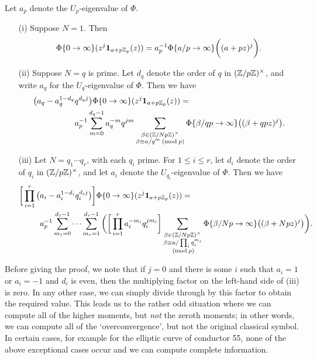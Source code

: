 \documentclass[a4paper,10pt]{article}
\numberwithin{equation}{section}
\begin{document}
\begin{proposition} Let $a_p$ denote the $U_p$-eigenvalue of $\Phi$.
\begin{itemize}
\item[(i)] Suppose $N = 1$. Then
\[
\Phi\{0\rightarrow\infty\}(z^j \mathbf{1}_{a+p\mathbb{Z}_p}(z)) = a_p^{-1}\Phi\{a/p \rightarrow \infty\}\bigg((a+pz)^j\bigg).
\]
\item[(ii)] Suppose $N = q$ is prime. Let $d_q$ denote the order of $q$ in $(\mathbb{Z}/p\mathbb{Z})^\times$, and write $a_q$ for the $U_q$-eigenvalue of $\Phi$. Then we have
\begin{align*}
\big(a_q -a_q^{1-d_q}&q^{d_qj}\big)\Phi\{0\rightarrow\infty\}(z^j \mathbf{1}_{a+p\Zp}(z)) =
\\
& a_p^{-1} \sum_{m = 0}^{d_q-1} a_q^{-m}q^{jm}%
\sum_{\substack{\beta \in (\Z/Np\Z)^\times\\ \beta \equiv a/q^m\newmod{p}}} \Phi\{\beta/qp\rightarrow \infty\}\big((\beta + qpz)^j\big).
\end{align*}

\item[(iii)]Let $N = q_1\cdots q_r$, with each $q_i$ prime. For $1\leq i \leq r$, let $d_i$ denote the order of $q_i$ in $(\mathbb{Z}/p\mathbb{Z})^\times$, and let $a_i$ denote the $U_{q_i}$-eigenvalue of $\Phi$. Then we have 
\begin{align*}
	\bigg[\prod_{i=1}^r\big(&a_i -a_i^{1-d_i}q_i^{d_ij}\big)\bigg]\Phi\{0\rightarrow\infty\}(z^j \mathbf{1}_{a+p\Zp}(z)) =
\\
&a_p^{-1} \sum_{m_1 = 0}^{d_1-1} \cdots \sum_{m_r = 1}^{d_r - 1} \bigg(\bigg[\prod_{i=1}^ra_i^{-m_i}q_i^{jm_i}\bigg]%
\sum_{\substack{\beta \in (\Z/Np\Z)^\times\\ \beta \equiv a/\prod_iq_i^{m_i} \\\newmod{p}}} \Phi\{\beta/Np\rightarrow \infty\}\big((\beta + Npz)^j\big)\bigg).
\end{align*}
\end{itemize}
\end{proposition}

\begin{remark}
Before giving the proof, we note that if $j = 0$ and there is some $i$ such that $a_{i} = 1$ or $a_{i} = -1$ and $d_i$ is even, then the multiplying factor on the left-hand side of (iii) is zero. In any other case, we can simply divide through by this factor to obtain the required value. This leads us to the rather odd situation where we can compute all of the higher moments, but \emph{not} the zeroth moments; in other words, we can compute all of the `overconvergence', but not the original classical symbol. In certain cases, for example for the elliptic curve of conductor 55, none of the above exceptional cases occur and we can compute complete information.
\end{remark}
\end{document}
